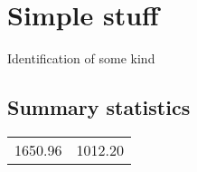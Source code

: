 \documentclass{article}
\begin{document}
\section{Simple stuff}
Identification of some kind
\subsection{Summary statistics}
\begin{tabular}{l|l}
\hline
1650.96&1012.20\\
\end{tabular}
\end{document}
